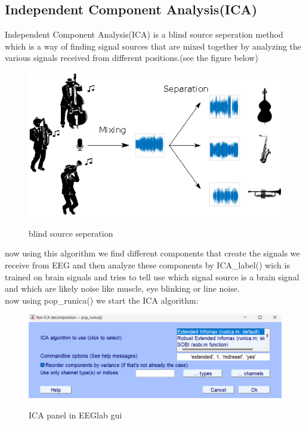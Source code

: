 \documentclass[11pt]{article}
\begin{document}
\subsection{Independent Component Analysis(ICA)}
Independent Component Analysis(ICA) is a blind source seperation method which
is a way of finding signal sources that are mixed together by analyzing the various 
signals received from different positions.(see the figure below)
\begin{figure}[H]
    \begin{center}
        \includegraphics[scale=0.7]{Fig/music_sep.png}
        \label{fig:blindSep}
        \caption{blind source seperation}
    \end{center}
\end{figure}

now using this algorithm we find different components that create the signals
we receive from EEG and then analyze these components by ICA\_label() wich
is trained on brain signals and tries to tell use which signal source is a brain
signal and which are likely noise like muscle, eye blinking or line noise. \\
now using pop\_runica() we start the ICA algorithm: \\
\begin{figure}[H]
    \begin{center}
        \includegraphics[scale=0.7]{Fig/ICA_data1.png}
        \label{fig:ICA_panel}
        \caption{ICA panel in EEGlab gui}
    \end{center}
\end{figure}
\end{document}
